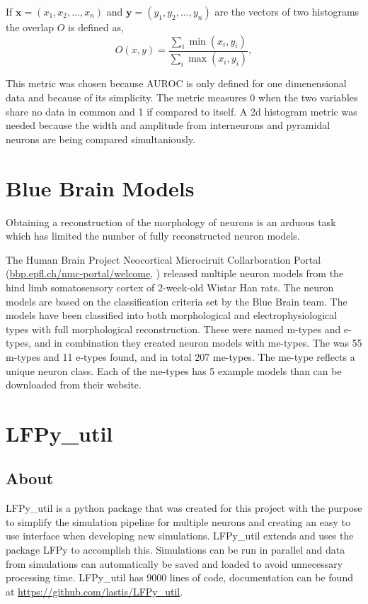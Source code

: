 \documentclass[altfont, fleqn]{uiophd}
\begin{document}
If 
$\bm{x} = (x_1, x_2, \ldots, x_n)$ and
$\bm{y} = (y_1, y_2, \ldots, y_n)$
are the vectors of two histograms 
the overlap $O$ is defined as, 
$$O(x, y) = \frac{\sum_i \min(x_i, y_i)}{\sum_i \max(x_i, y_i)},$$

This metric was chosen because AUROC is only defined for one
dimenensional data and because of its simplicity.
The metric measures 0 when the two variables share no data in common 
and 1 if compared to itself. 
A 2d histogram metric was needed because the width and amplitude from
interneurons and pyramidal neurons are being compared simultaniously. 
\newline 

\section{Blue Brain Models}
\label{sec:blue_brain}

Obtaining a reconstruction of the morphology of neurons is an
arduous task which has limited the number of fully
reconstructed neuron models.

The Human Brain Project Neocortical
Microciruit Collarboration Portal
(\url{bbp.epfl.ch/nmc-portal/welcome},
\textcite{ramaswamy_neocortical_2015})
released multiple neuron models from the hind limb somatosensory cortex 
of 2-week-old Wistar Han rats.
The neuron models are based on the classification criteria set by the Blue Brain 
team.
The models have been classified into both morphological and electrophysiological
types with full morphological reconstruction. 
These were named m-types and e-types, and in combination they
created neuron models with me-types. 
The was 55 m-types and 11 e-types found, and in total
207 me-types. 
The me-type reflects a unique neuron class. 
Each of the me-types has 5 example models than can be downloaded from their website.


\newpage
\section{LFPy\_util}
\subsection{About}
LFPy\_util is a python package that was created for this project with the purpose
to simplify the simulation pipeline for multiple neurons and creating
an easy to use interface when developing new simulations. 
LFPy\_util extends and uses the package LFPy to accomplish this. 
Simulations can be run in parallel and data from simulations can
automatically be saved and loaded to avoid unnecessary processing time.
LFPy\_util has 9000 lines of code, documentation can be found at
\url{https://github.com/lastis/LFPy_util}. 
\end{document}
